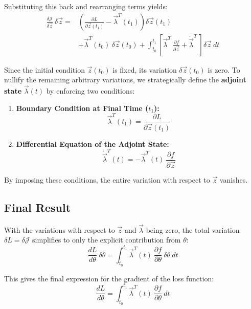 Substituting this back and rearranging terms yields:
\begin{equation}
    \begin{split}
        \frac{\delta \mathcal{J}}{\delta \vec{z}}\ \delta \vec{z} =
        & \left(
            \frac{\partial L}{\partial \vec{z}(t_1)} - \vec{\lambda}^T(t_1)
        \right) \delta\vec{z}(t_1) \\
        & + \vec{\lambda}^T(t_0)\ \delta\vec{z}(t_0) +
        \int_{t_0}^{t_1} \left[
            \vec{\lambda}^{T}\ \frac{\partial f}{\partial \vec{z}} +
            \dot{\vec{\lambda}}^{T}\
        \right]\delta \vec{z} \ dt
    \end{split}
\end{equation}

Since the initial condition $\vec{z}(t_0)$ is fixed, its variation $\delta\vec{z}(t_0)$ is zero. 
To nullify the remaining arbitrary variations, 
we strategically define the \textbf{adjoint state} $\vec{\lambda}(t)$ by enforcing two conditions:
\begin{enumerate}
    \item \textbf{Boundary Condition at Final Time ($t_1$):}
    \begin{equation}
        \vec{\lambda}^T(t_1) = \frac{\partial L}{\partial \vec{z}(t_1)}
        \label{eq:adjoint_bvp}
    \end{equation}
    \item \textbf{Differential Equation of the Adjoint State:}
    \begin{equation}
        \dot{\vec{\lambda}}^{T}(t) = - \vec{\lambda}^{T}(t)\ \frac{\partial f}{\partial \vec{z}}
        \label{eq:adjoint_dynamics}
    \end{equation}
\end{enumerate}

By imposing these conditions, the entire variation with respect to $\vec{z}$ vanishes.

\subsection{Final Result}
With the variations with respect to $\vec{z}$ and $\vec{\lambda}$ being zero, the total variation 
$\delta L = \delta \mathcal{J}$ simplifies to only the explicit contribution from $\theta$:
\begin{equation}
    \frac{d L}{d \theta}\ \delta \theta =
    \int_{t_0}^{t_1} \vec{\lambda}^{T}(t)\
        \frac{\partial f}{\partial \theta}\ \delta \theta\ dt
\end{equation}

This gives the final expression for the gradient of the loss function:
\begin{equation}
    \frac{d L}{d \theta} =
    \int_{t_0}^{t_1} \vec{\lambda}^{T}(t)\
        \frac{\partial f}{\partial \theta}\ dt
    \label{eq:adjoint_grad}
\end{equation}